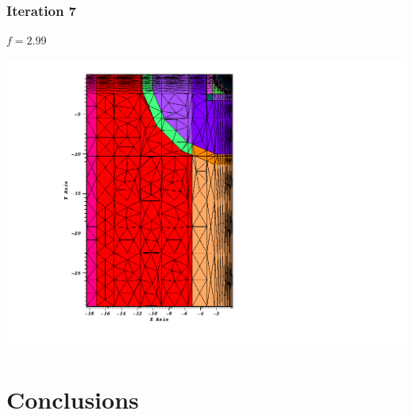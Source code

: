 \documentclass[compress]{beamer}
\begin{document}
\begin{frame}[t]\frametitle{Iteration 7}
\begin{minipage}{0.15\textwidth}
\begin{footnotesize}
$f = 2.99$
\end{footnotesize}
\end{minipage}
\begin{minipage}{0.8\textwidth}
\centering
\includegraphics[scale=0.3]{figures/IM1_post_iterations0000.png}
\end{minipage}
\end{frame}


\section{Conclusions}
\end{document}
